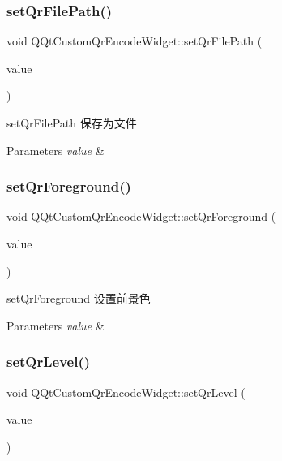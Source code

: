 \subsubsection{\texorpdfstring{set\+Qr\+File\+Path()}{setQrFilePath()}}
{\footnotesize\ttfamily void Q\+Qt\+Custom\+Qr\+Encode\+Widget\+::set\+Qr\+File\+Path (\begin{DoxyParamCaption}\item[{const Q\+String \&}]{value }\end{DoxyParamCaption})}



set\+Qr\+File\+Path 保存为文件 


\begin{DoxyParams}{Parameters}
{\em value} & \\
\hline
\end{DoxyParams}
\mbox{\label{class_q_qt_custom_qr_encode_widget_a8cabaac803e1229f8672afa308922075}} 
\subsubsection{\texorpdfstring{set\+Qr\+Foreground()}{setQrForeground()}}
{\footnotesize\ttfamily void Q\+Qt\+Custom\+Qr\+Encode\+Widget\+::set\+Qr\+Foreground (\begin{DoxyParamCaption}\item[{const Q\+Color \&}]{value }\end{DoxyParamCaption})}



set\+Qr\+Foreground 设置前景色 


\begin{DoxyParams}{Parameters}
{\em value} & \\
\hline
\end{DoxyParams}
\mbox{\label{class_q_qt_custom_qr_encode_widget_afca08e7e77a3951096eae234f53dd400}} 
\subsubsection{\texorpdfstring{set\+Qr\+Level()}{setQrLevel()}}
{\footnotesize\ttfamily void Q\+Qt\+Custom\+Qr\+Encode\+Widget\+::set\+Qr\+Level (\begin{DoxyParamCaption}\item[{const \mbox{\hyperlink{class_q_qt_custom_qr_encode_widget_a6107aaf68178d54d1274f0afc2ec310b}{Q\+R\+\_\+\+L\+E\+V\+EL}} \&}]{value }\end{DoxyParamCaption})}



